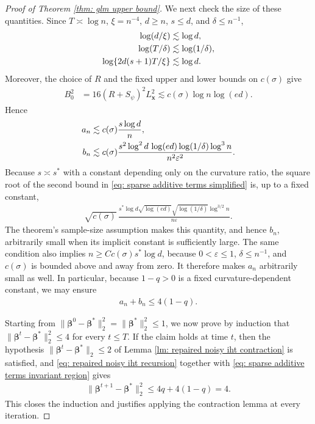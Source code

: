 \documentclass[letterpaper,12pt]{article}
\numberwithin{equation}{section}
\theoremstyle{plain}
\numberwithin{Theorem}{section}
\numberwithin{proposition}{section}
\numberwithin{Lemma}{section}
{
	\theoremstyle{definition}
	\newtheorem{Definition}{Definition}
	\newtheorem{example}{Example}
	\numberwithin{example}{section}
	\newtheorem{fact}{Fact}
	\numberwithin{fact}{section}
	\newtheorem{remark}{Remark}
}
\newcommand{\1}{\mathbbm{1}}
\def\bbeta{{\boldsymbol{\beta}}}
\begin{document}
\begin{proof}[Proof of Theorem \ref{thm: glm upper bound}]
We next check the size of these quantities.  Since
$T\asymp\log n$, $\xi=n^{-4}$, $d\geq n$, $s\leq d$, and
$\delta\leq n^{-1}$,
\begin{align}
\log(d/\xi)&\lesssim\log d,\notag\\
\log(T/\delta)&\lesssim\log(1/\delta),\notag\\
\log\{2d(s+1)T/\xi\}&\lesssim\log d.                     \label{eq: sparse logarithm simplifications}
\end{align}
Moreover, the choice of $R$ and the fixed upper and lower bounds on
$c(\sigma)$ give
\begin{align*}
B_0^2
&=16(R+S_\psi)^2L_{\bm x}^2
\lesssim c(\sigma)\log n\log(ed).
\end{align*}
Hence
\begin{align}
a_n&\lesssim c(\sigma)\frac{s\log d}{n},\notag\\
b_n&\lesssim c(\sigma)
\frac{s^2\log^2d\,\log(ed)\log(1/\delta)\log^3n}
{n^2\varepsilon^2}.                                      \label{eq: sparse additive terms simplified}
\end{align}
Because $s\asymp s^*$ with a constant depending only on the curvature
ratio, the square root of the second bound in
\eqref{eq: sparse additive terms simplified} is, up to a fixed
constant,
\begin{align*}
\sqrt{c(\sigma)}\,
\frac{s^*\log d\sqrt{\log(ed)}
\sqrt{\log(1/\delta)}\log^{3/2}n}{n\varepsilon}.
\end{align*}
The theorem's sample-size assumption makes this quantity, and hence
\(b_n\), arbitrarily small when its implicit constant is sufficiently
large.  The same condition also implies
\(n\geq Cc(\sigma)s^*\log d\), because
\(0<\varepsilon\leq1\), \(\delta\leq n^{-1}\), and
\(c(\sigma)\) is bounded above and away from zero.  It therefore makes
\(a_n\) arbitrarily small as well.  In particular, because
\(1-q>0\) is a fixed curvature-dependent constant, we may ensure
\begin{align}
    a_n+b_n\leq4(1-q).                                    \label{eq: sparse additive terms invariant region}
\end{align}

Starting from
$\|\bbeta^0-\bbeta^*\|_2^2=\|\bbeta^*\|_2^2\leq1$, we now prove by
induction that $\|\bbeta^t-\bbeta^*\|_2^2\leq4$ for every
$t\leq T$.  If the claim holds at time $t$, then the hypothesis
$\|\bbeta^t-\bbeta^*\|_2\leq2$ of Lemma
\ref{lm: repaired noisy iht contraction} is satisfied, and
\eqref{eq: repaired noisy iht recursion} together with
\eqref{eq: sparse additive terms invariant region} gives
\begin{align*}
\|\bbeta^{t+1}-\bbeta^*\|_2^2
\leq4q+4(1-q)=4.
\end{align*}
This closes the induction and justifies applying the contraction lemma
at every iteration.


\end{proof}
\end{document}
